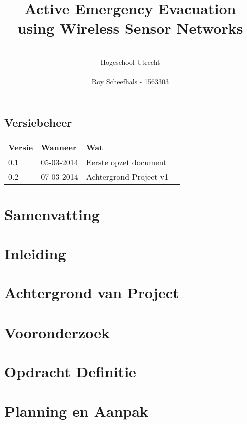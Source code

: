\documentclass{../local}
\title{\textbf{Active Emergency Evacuation using Wireless Sensor Networks}}
\author{\\
		Hogeschool Utrecht\\
		\\
		Roy Scheefhals - 1563303}
\begin{document}
 
\maketitle
\newpage\null\thispagestyle{empty}

\renewcommand{\thesection}{\Roman{section}}

\section*{Versiebeheer}
\begin{tabular}{ | l | l | l | p{7.5cm} |}
\hline
Versie & Wanneer & Wat \\ \hline
0.1 & 05-03-2014 & Eerste opzet document\\ \hline
0.2 & 07-03-2014 & Achtergrond Project v1\\ \hline

\end{tabular}
\clearpage

\chapter{Samenvatting}

\clearpage

\chapter{Inleiding}

\clearpage

\newpage\null\thispagestyle{empty}

\renewcommand{\thesection}{\arabic{section}}

\renewcommand*\contentsname{Inhoud}
\thispagestyle{empty}
\setcounter{page}{0}
\tableofcontents
\clearpage

\chapter{Achtergrond van Project} 


\chapter{Vooronderzoek}


\chapter{Opdracht Definitie}


\chapter{Planning en Aanpak}


%
%


%
\end{document}
